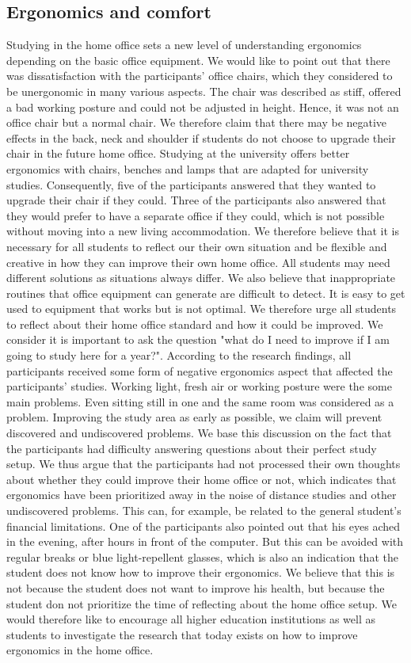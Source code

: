 \documentclass{sigchi}
\begin{document}
\subsection{Ergonomics and comfort}
Studying in the home office sets a new level of understanding ergonomics depending on the basic office equipment. We would like to point out that there was dissatisfaction with the participants' office chairs, which they considered to be unergonomic in many various aspects. The chair was described as stiff, offered a bad working posture and could not be adjusted in height. Hence, it was not an office chair but a normal chair. We therefore claim that there may be negative effects in the back, neck and shoulder if students do not choose to upgrade their chair in the future home office. Studying at the university offers better ergonomics with chairs, benches and lamps that are adapted for university studies. Consequently, five of the participants answered that they wanted to upgrade their chair if they could. Three of the participants also answered that they would prefer to have a separate office if they could, which is not possible without moving into a new living accommodation. We therefore believe that it is necessary for all students to reflect our their own situation and be flexible and creative in how they can improve their own home office. All students may need different solutions as situations always differ. We also believe that inappropriate routines that office equipment can generate are difficult to detect. It is easy to get used to equipment that works but is not optimal. We therefore urge all students to reflect about their home office standard and how it could be improved. We consider it is important to ask the question "what do I need to improve if I am going to study here for a year?". According to the research findings, all participants received some form of negative ergonomics aspect that affected the participants’ studies. Working light, fresh air or working posture were the some main problems. Even sitting still in one and the same room was considered as a problem. Improving the study area as early as possible, we claim will prevent discovered and undiscovered problems. We base this discussion on the fact that the participants had difficulty answering questions about their perfect study setup. We thus argue that the participants had not processed their own thoughts about whether they could improve their home office or not, which indicates that ergonomics have been prioritized away in the noise of distance studies and other undiscovered problems. This can, for example, be related to the general student's financial limitations. One of the participants also pointed out that his eyes ached in the evening, after hours in front of the computer. But this can be avoided with regular breaks or blue light-repellent glasses, which is also an indication that the student does not know how to improve their ergonomics. We believe that this is not because the student does not want to improve his health, but because the student don not prioritize the time of reflecting about the home office setup. We would therefore like to encourage all higher education institutions as well as students to investigate the research that today exists on how to improve ergonomics in the home office. 
\end{document}
